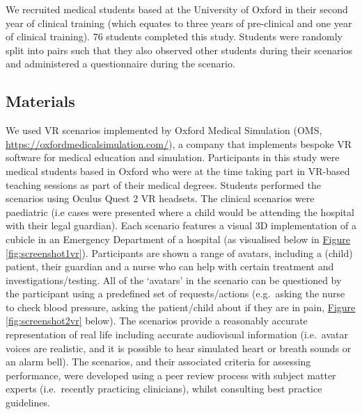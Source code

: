 \documentclass[a4paper, nobind]{templates/ociamthesis}
\begin{document}
We recruited medical students based at the University of Oxford in their second year of clinical training (which equates to three years of pre-clinical and one year of clinical training). 76 students completed this study. Students were randomly split into pairs such that they also observed other students during their scenarios and administered a questionnaire during the scenario.

\subsection{Materials}\label{materials}

We used VR scenarios implemented by Oxford Medical Simulation (OMS, \url{https://oxfordmedicalsimulation.com/}), a company that implements bespoke VR software for medical education and simulation. Participants in this study were medical students based in Oxford who were at the time taking part in VR-based teaching sessions as part of their medical degrees. Students performed the scenarios using Oculus Quest 2 VR headsets. The clinical scenarios were paediatric (i.e cases were presented where a child would be attending the hospital with their legal guardian). Each scenario features a visual 3D implementation of a cubicle in an Emergency Department of a hospital (as visualised below in \hyperref[fig:screenshot1vr]{Figure \ref{fig:screenshot1vr}}). Participants are shown a range of avatars, including a (child) patient, their guardian and a nurse who can help with certain treatment and investigations/testing. All of the `avatars' in the scenario can be questioned by the participant using a predefined set of requests/actions (e.g.~asking the nurse to check blood pressure, asking the patient/child about if they are in pain, \hyperref[fig:screenshot2vr]{Figure \ref{fig:screenshot2vr}} below). The scenarios provide a reasonably accurate representation of real life including accurate audiovisual information (i.e.~avatar voices are realistic, and it is possible to hear simulated heart or breath sounds or an alarm bell). The scenarios, and their associated criteria for assessing performance, were developed using a peer review process with subject matter experts (i.e.~recently practicing clinicians), whilst consulting best practice guidelines.

\newpage
\end{document}
